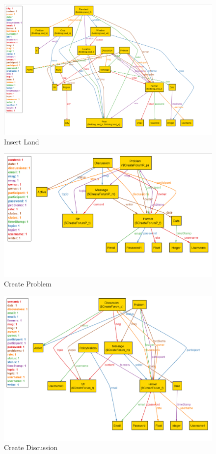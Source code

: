 \begin{figure}[H]
  \centering
  \includegraphics[width=0.9\textheight,keepaspectratio, angle=90]{figures/CreateFarmland1.png}
  \caption{Insert Land}
\end{figure}
\begin{figure}[H]
  \centering
  \includegraphics[width=0.9\textheight,keepaspectratio, angle=90]{figures/CreateProblem.png}
  \caption{Create Problem}
\end{figure}
\begin{figure}[H]
  \centering
  \includegraphics[width=0.9\textheight,keepaspectratio, angle=90]{figures/CreateDiscussion.png}
  \caption{Create Discussion}
\end{figure}
